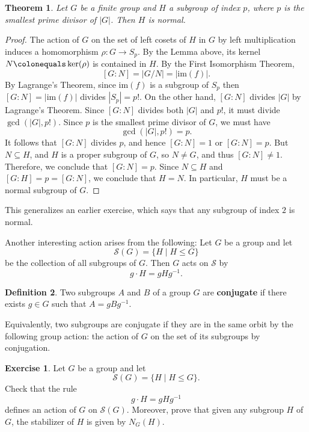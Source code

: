 \documentclass[12pt]{report}
\newtheorem{theorem}{Theorem}[chapter]
\numberwithin{equation}{section}
\numberwithin{theorem}{chapter}
\theoremstyle{definition}
\newtheorem{definition}[theorem]{Definition}
\newtheorem{exercise}{Exercise}
\newtheorem*{basic properties}{Basic Properties}
\newtheorem*{Important Remark}{Important Remark}
\renewcommand{\ker}{\operatorname{ker}}
\begin{document}
\begin{theorem}
	 Let $G$ be a finite group and $H$ a subgroup of index $p$, where $p$ is the smallest prime divisor of $|G|$. Then $H$ is normal.
\end{theorem}


\begin{proof} 
The action of $G$ on the set of left cosets of $H$ in $G$ by left multiplication induces a homomorphism $\rho\!: G \to S_p$. By the Lemma above, its kernel $N \colonequals \ker(\rho)$ is contained in $H$. By the First Isomorphism Theorem,
$$[G:N] = |G/N| = |\mathrm{im}(f)|.$$
By Lagrange's Theorem, since $\mathrm{im}(f)$ is a subgroup of $S_p$ then $[G:N] = |\mathrm{im}(f)|$ divides $|S_p|=p!$.
On the other hand, $[G:N]$ divides $|G|$ by Lagrange's Theorem. Since $[G:N]$ divides both $|G|$ and $p!$, it must divide $\gcd(|G|,p!)$. Since $p$ is the smallest prime divisor of $G$, we must have 
$$\gcd(|G|, p!) = p.$$ 
It follows that $[G:N]$ divides $p$, and hence $[G:N] =1$ or $[G:N] = p$. 
But $N \subseteq H$, and $H$ is a proper subgroup of $G$, so $N \neq G$, and thus $[G:N] \neq 1$. Therefore, we conclude that $[G:N] = p$. 
Since $N \subseteq H$ and $[G:H] = p = [G : N]$, we conclude that $H = N$. In particular, $H$ must be a normal subgroup of $G$.
\end{proof}


This generalizes an earlier exercise, which says that any subgroup of index $2$ is normal.



Another interesting action arises from the following:
Let $G$ be a group and let
$$\mathcal{S}(G) = \{H \mid H \leq G \}$$ 
be the collection of all subgroups of $G$. Then $G$ acts on $\mathcal{S}$ by 
$$g \cdot H = gHg^{-1}.$$


\begin{definition}
	Two subgroups $A$ and $B$ of a group $G$ are {\bf conjugate} if there exists $g \in G$ such that $A = gBg^{-1}$.
\end{definition}


Equivalently, two subgroups are conjugate if they are in the same orbit by the following group action: the action of $G$ on the set of its subgroups by conjugation.

\begin{exercise}\label{stabilizer of H by conjugation is N(G)}
Let $G$ be a group and let
$$\mathcal{S}(G) = \{H \mid H \leq G \}.$$ 
	Check that the rule
	$$g \cdot H = gHg^{-1}$$
	defines an action of $G$ on $\mathcal{S}(G)$. Moreover, prove that given any subgroup $H$ of $G$, the stabilizer of $H$ is given by $N_G(H)$.
\end{exercise}
\end{document}
